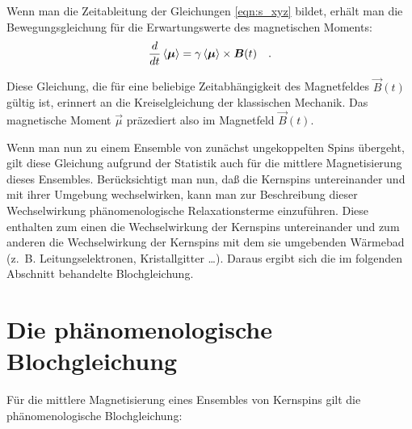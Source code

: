 Wenn man die Zeitableitung der Gleichungen \eqref{eqn:s_xyz} bildet, erhält man die
Bewegungsgleichung für die Erwartungswerte des magnetischen Moments:
	\begin{equation}
		\frac{d}{dt}\left<\bm \mu\right>=\gamma\left<\bm\mu\right> \times \bm B(t)\quad\text{.}
	\end{equation}

Diese Gleichung, die für eine beliebige Zeitabhängigkeit des Magnetfeldes $\vec B(t)$ gültig
ist, erinnert an die Kreiselgleichung der klassischen Mechanik. Das magnetische Moment $\vec \mu$
präzediert also im Magnetfeld $\vec B(t)$.

Wenn man nun zu einem Ensemble von zunächst ungekoppelten Spins übergeht, gilt diese Gleichung
aufgrund der Statistik auch für die mittlere Magnetisierung dieses Ensembles. Berücksichtigt man
nun, daß die Kernspins untereinander und mit ihrer Umgebung wechselwirken, kann man zur
Beschreibung dieser Wechselwirkung phänomenologische Relaxationsterme einzuführen. Diese enthalten
zum einen die Wechselwirkung der Kernspins untereinander und zum anderen die Wechselwirkung der
Kernspins mit dem sie umgebenden Wärmebad (z.\ B. Leitungselektronen, Kristallgitter \ldots).
Daraus ergibt sich die im folgenden Abschnitt behandelte Blochgleichung.


\section{Die phänomenologische Blochgleichung}
\label{sec:blocheqn}

Für die mittlere Magnetisierung eines Ensembles von Kernspins gilt die phänomenologische
Blochgleichung:

